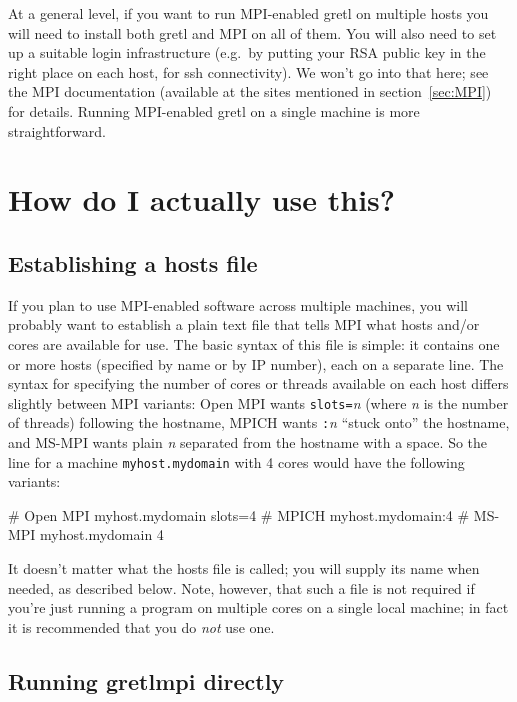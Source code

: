 \documentclass{article}
\begin{document}
At a general level, if you want to run MPI-enabled gretl on multiple
hosts you will need to install both gretl and MPI on all of them. You
will also need to set up a suitable login infrastructure (e.g.\ by
putting your RSA public key in the right place on each host, for
\textsf{ssh} connectivity).  We won't go into that here; see the MPI
documentation (available at the sites mentioned in
section~\ref{sec:MPI}) for details. Running MPI-enabled gretl on a
single machine is more straightforward.

\section{How do I actually use this?}
\label{sec:usage}

\subsection{Establishing a hosts file}
\label{subsec:hosts}

If you plan to use MPI-enabled software across multiple machines, you
will probably want to establish a plain text file that tells MPI what
hosts and/or cores are available for use. The basic syntax of this
file is simple: it contains one or more hosts (specified by name or by
IP number), each on a separate line.  The syntax for specifying the
number of cores or threads available on each host differs slightly
between MPI variants: \textsf{Open MPI} wants
\texttt{slots=}\textsl{n} (where \textsl{n} is the number of threads)
following the hostname, \textsf{MPICH} wants \texttt{:}\textsl{n}
``stuck onto'' the hostname, and \textsf{MS-MPI} wants plain
\textsl{n} separated from the hostname with a space. So the line for a
machine \texttt{myhost.mydomain} with 4 cores would have the following
variants:
\begin{code}
# Open MPI
myhost.mydomain slots=4
# MPICH
myhost.mydomain:4
# MS-MPI
myhost.mydomain 4
\end{code}

It doesn't matter what the hosts file is called; you will supply its
name when needed, as described below. Note, however, that such a file
is not required if you're just running a program on multiple cores on
a single local machine; in fact it is recommended that you do
\textit{not} use one.

\subsection{Running gretlmpi directly}
\label{subsec:gretlmpi}
\end{document}
